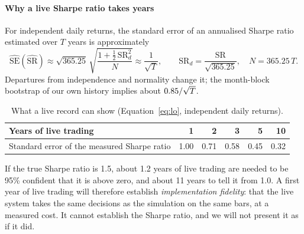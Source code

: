 \documentclass[11pt,a4paper]{article}
\newcommand{\thead}[1]{{\sffamily\bfseries\footnotesize #1}}
\begin{document}
\paragraph{Why a live Sharpe ratio takes years} For independent daily returns, the standard error of an annualised Sharpe ratio
estimated over $T$ years is approximately \citep{lo2002}
\begin{equation}
\widehat{\mathrm{SE}}(\widehat{\mathrm{SR}}) \approx \sqrt{365.25}\,\sqrt{\frac{1+\tfrac12\,\mathrm{SR}_d^2}{N}} \approx \frac{1}{\sqrt{T}},
\qquad \mathrm{SR}_d=\frac{\mathrm{SR}}{\sqrt{365.25}},\quad N=365.25\,T .
\label{eq:lo}
\end{equation}
Departures from independence and normality change it; the month-block bootstrap of our own history implies about $0.85/\sqrt{T}$.

\begin{table}[H]
\centering\small
\caption{What a live record can show (Equation~\ref{eq:lo}, independent daily returns).}
\label{tab:lo}
\begin{tabular}{@{}lrrrrr@{}}
\toprule
\thead{Years of live trading} & \thead{1} & \thead{2} & \thead{3} & \thead{5} & \thead{10}\\
\midrule
Standard error of the measured Sharpe ratio & 1.00 & 0.71 & 0.58 & 0.45 & 0.32\\
\bottomrule
\end{tabular}
\end{table}

If the true Sharpe ratio is 1.5, about 1.2 years of live trading are needed to be 95\% confident that it is above zero, and about
11 years to tell it from 1.0. A first year of live
trading will therefore establish \emph{implementation fidelity}: that the live system takes the same decisions as the simulation on
the same bars, at a measured cost. It cannot establish the Sharpe ratio, and we will not present it as if it did.
\end{document}
